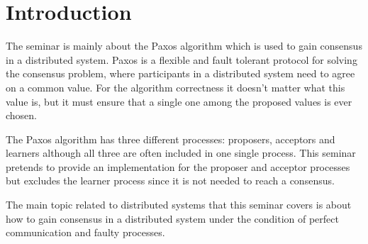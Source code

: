 \section{Introduction}
\label{sec:Introduction}

The seminar is mainly about the Paxos algorithm which is used to gain consensus
in a distributed system. Paxos is a flexible and fault tolerant protocol for
solving the consensus problem, where participants in a distributed system
need to agree on a common value. For the algorithm correctness it doesn’t matter
what this value is, but it must ensure that a single one among the proposed values
is ever chosen.

The Paxos algorithm has three different processes: proposers, acceptors and learners
although all three are often included in one single process. This seminar pretends
to provide an implementation for the proposer and acceptor processes but excludes 
the learner process since it is not needed to reach a consensus. 

The main topic related to distributed systems that this seminar covers is about how to
gain consensus in a distributed system under the condition of perfect communication
and faulty processes.
